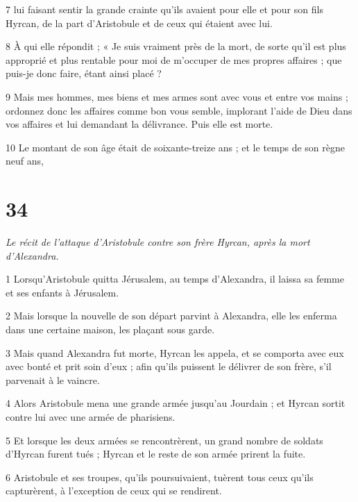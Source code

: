 \par 7 lui faisant sentir la grande crainte qu'ils avaient pour elle et pour son fils Hyrcan, de la part d'Aristobule et de ceux qui étaient avec lui.

\par 8 À qui elle répondit ; « Je suis vraiment près de la mort, de sorte qu'il est plus approprié et plus rentable pour moi de m'occuper de mes propres affaires ; que puis-je donc faire, étant ainsi placé ?

\par 9 Mais mes hommes, mes biens et mes armes sont avec vous et entre vos mains ; ordonnez donc les affaires comme bon vous semble, implorant l'aide de Dieu dans vos affaires et lui demandant la délivrance. Puis elle est morte.

\par 10 Le montant de son âge était de soixante-treize ans ; et le temps de son règne neuf ans,

\chapter{34}

\par \textit{Le récit de l'attaque d'Aristobule contre son frère Hyrcan, après la mort d'Alexandra.}

\par 1 Lorsqu'Aristobule quitta Jérusalem, au temps d'Alexandra, il laissa sa femme et ses enfants à Jérusalem.

\par 2 Mais lorsque la nouvelle de son départ parvint à Alexandra, elle les enferma dans une certaine maison, les plaçant sous garde.

\par 3 Mais quand Alexandra fut morte, Hyrcan les appela, et se comporta avec eux avec bonté et prit soin d'eux ; afin qu'ils puissent le délivrer de son frère, s'il parvenait à le vaincre.

\par 4 Alors Aristobule mena une grande armée jusqu'au Jourdain ; et Hyrcan sortit contre lui avec une armée de pharisiens.

\par 5 Et lorsque les deux armées se rencontrèrent, un grand nombre de soldats d'Hyrcan furent tués ; Hyrcan et le reste de son armée prirent la fuite.

\par 6 Aristobule et ses troupes, qu'ils poursuivaient, tuèrent tous ceux qu'ils capturèrent, à l'exception de ceux qui se rendirent.


